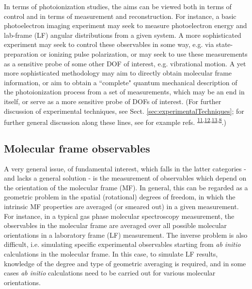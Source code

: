 \documentclass[10pt]{article}
\begin{document}
In terms of photoionization studies, the aims can be viewed both in terms of control and in terms of measurement and reconstruction. For instance, a basic photoelectron imaging experiment may seek to measure photoelectron energy and lab-frame (LF) angular distributions from a given system. A more sophisticated experiment may seek to control these observables in some way, e.g. via state-preparation or ionizing pulse polarization, or may seek to use these measurements as a sensitive probe of some other DOF of interest, e.g. vibrational motion. A yet more sophisticated methodology may aim to directly obtain molecular frame information, or aim to obtain a ``complete" quantum mechanical description of the photoionization process from a set of measurements, which may be an end in itself, or serve as a more sensitive probe of DOFs of interest. (For further discussion of experimental techniques, see Sect. \ref{sec:experimentalTechniques}; for further general discussion along these lines, see for example refs. \textsuperscript{\hyperref[csl:11]{11},\hyperref[csl:12]{12},\hyperref[csl:13]{13},\hyperref[csl:8]{8}}.)

\subsection{Molecular frame observables\label{sec:MF-intro}}

A very general issue, of fundamental interest, which falls in the latter categories - and lacks a general solution - is the measurement of observables which depend on the orientation of the molecular frame (MF). In general, this can be regarded as a geometric problem in the spatial (rotational) degrees of freedom, in which the intrinsic MF properties are averaged (or smeared out) in a given measurement. For instance, in a typical gas phase molecular spectroscopy measurement, the observables in the molecular frame  are averaged over all possible molecular orientations in a laboratory frame (LF) measurement. The inverse problem is also difficult, i.e. simulating specific experimental observables starting from \textit{ab initio} calculations in the molecular frame. In this case, to simulate LF results, knowledge of the degree and type of geometric averaging is required, and in some cases \textit{ab initio} calculations need to be carried out for various molecular orientations.
\end{document}
